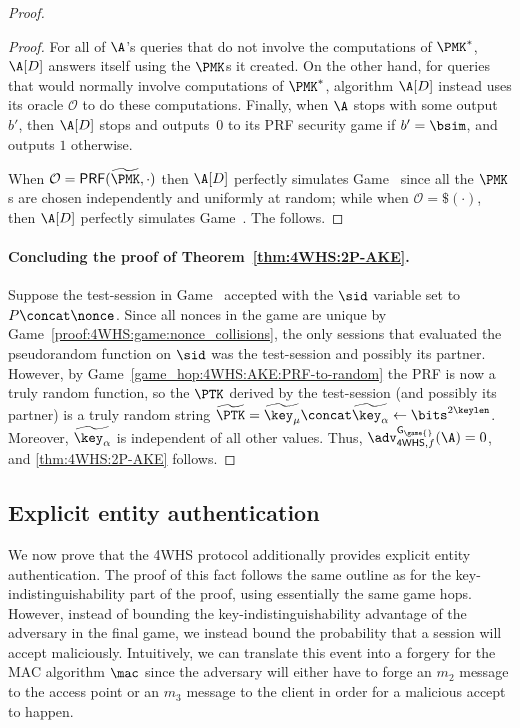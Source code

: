 \begin{proof}
\begin{proof}
For all of $\A$'s queries that do not involve the computations of $\PMK^*$,
$\A[D]$ answers itself using the $\PMK$s it created.
On the other hand,
for queries that would normally involve computations of $\PMK^*$,
algorithm $\A[D]$ instead uses its oracle $\mathcal{O}$ to do these computations.
Finally,
when $\A$ stops with some output~$b'$,
then $\A[D]$ stops and outputs~$0$ to its PRF security game if $b' = \bsim$,
and outputs $1$ otherwise.

When $\mathcal{O} = \mathsf{PRF}(\widetilde{\PMK}, \cdot)$
then $\A[D]$ perfectly simulates Game~\prevgame{} since all the $\PMK$s are chosen independently and uniformly at random;
while when $\mathcal{O} = \$(\cdot)$, then $\A[D]$ perfectly simulates Game~\game{}.
The  follows.
\end{proof}

\paragraph{Concluding the proof of Theorem~\ref{thm:4WHS:2P-AKE}.}
Suppose the test-session in Game~\game{} accepted with the $\sid$ variable set to $P \concat \nonce$.
Since all nonces in the game are unique by Game~\ref{proof:4WHS:game:nonce_collisions},
the only sessions that evaluated the pseudorandom function on $\sid$ was the test-session and possibly its partner.
However, by Game~\ref{game_hop:4WHS:AKE:PRF-to-random} the PRF is now a truly random function,
so the $\PTK$ derived by the test-session (and possibly its partner) is a truly random string $\widetilde{\PTK} = \widetilde{\key_\mu} \concat \widetilde{\key_\alpha} \gets \bits^{2\keylen}$.
Moreover,
$\widetilde{\key_\alpha}$ is independent of all other values.
Thus,
$\adv_{\mathsf{4WHS},f}^{\mathsf{G_{\game{}}}}(\A) = 0$,
and \cref{thm:4WHS:2P-AKE} follows.
\end{proof} %









\subsection{Explicit entity authentication}\label{sec:802.11:4WHS:EA}
We now prove that the 4WHS protocol additionally provides explicit entity authentication.
The proof of this fact follows the same outline as for the key-indistinguishability part of the proof,
using essentially the same game hops.
However,
instead of bounding the key-indistinguishability advantage of the adversary in the final game,
we instead bound the probability that a session will accept maliciously.
Intuitively,
we can translate this event into a forgery for the MAC algorithm $\mac$ since the adversary will either have to forge an $m_2$ message to the access point or an $m_3$ message to the client in order for a malicious accept to happen.



